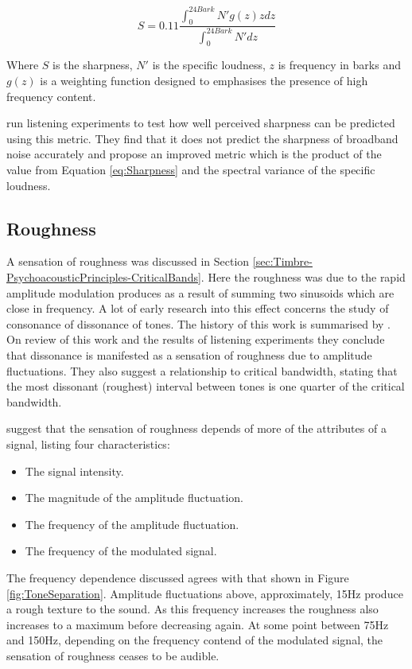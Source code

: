 		\begin{equation}
			S = 0.11\frac{\int_{0}^{24Bark} N'g(z)zdz}{\int_{0}^{24Bark}N'dz}
			\label{eq:Sharpness}
		\end{equation}

		Where $S$ is the sharpness, $N'$ is the specific loudness, $z$ is frequency in barks and $g(z)$ is a
		weighting function designed to emphasises the presence of high frequency content.

		\citet{marui2006predicting} run listening experiments to test how well perceived sharpness can be predicted
		using this metric. They find that it does not predict the sharpness of broadband noise accurately and
		propose an improved metric which is the product of the value from Equation \ref{eq:Sharpness} and the
		spectral variance of the specific loudness.

	\subsection{Roughness}
	A sensation of roughness was discussed in Section \ref{sec:Timbre-PsychoacousticPrinciples-CriticalBands}. Here the
	roughness was due to the rapid amplitude modulation produces as a result of summing two sinusoids which are close in
	frequency. A lot of early research into this effect concerns the study of consonance of dissonance of tones. The
	history of this work is summarised by \citet{plomp1965tonal}. On review of this work and the results of listening
	experiments they conclude that dissonance is manifested as a sensation of roughness due to amplitude fluctuations.
	They also suggest a relationship to critical bandwidth, stating that the most dissonant (roughest) interval between
	tones is one quarter of the critical bandwidth.

	\citet{vassilakis2010psychoacoustic} suggest that the sensation of roughness depends of more of the
	attributes of a signal, listing four characteristics:

	\begin{itemize}
		\item The signal intensity.
		\item The magnitude of the amplitude fluctuation.
		\item The frequency of the amplitude fluctuation.
		\item The frequency of the modulated signal.
	\end{itemize}

	The frequency dependence discussed agrees with that shown in Figure \ref{fig:ToneSeparation}. Amplitude fluctuations
	above, approximately, 15Hz produce a rough texture to the sound. As this frequency increases the roughness also
	increases to a maximum before decreasing again. At some point between 75Hz and 150Hz, depending on the frequency
	contend of the modulated signal, the sensation of roughness ceases to be audible.


